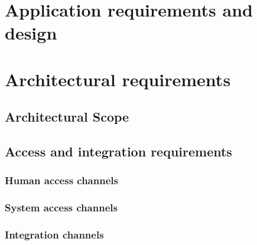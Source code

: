 \documentclass[a4paper,12pt,titlepage]{article}
\begin{document}


\tableofcontents
\newpage


\section{Application requirements and design}


\newpage

\newpage

\newpage

\newpage

\newpage



\newpage
\section{Architectural requirements}
	\subsection{Architectural Scope} %
	
	
	\subsection{Access and integration requirements}
			\subsubsection{Human access channels}	
				
			\subsubsection{System access channels}
					
			\subsubsection{Integration channels}
				
\end{document}
